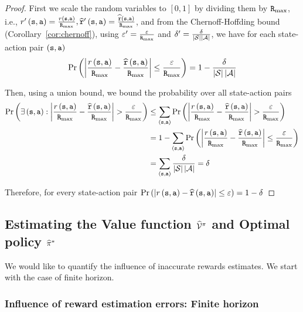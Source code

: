 \begin{proof}
First we scale the random variables to $\left[0,1\right]$ by dividing
them by ${\tt R}_{\max }$, i.e., $r'\left({\tt s},{\tt a}\right)=\frac{r\left({\tt s},{\tt a}\right)}{{\tt R}_{\max }},\widehat{{\tt r}}'\left({\tt s},{\tt a}\right)=\frac{\widehat{{\tt r}}\left({\tt s},{\tt a}\right)}{{\tt R}_{\max }}$,
and from the Chernoff-Hoffding bound (Corollary~\ref{cor:chernoff}), using $\varepsilon'=\frac{\varepsilon}{{\tt R}_{\max }}$
and $\delta'=\frac{\delta}{\left|\mathcal{S}\right|\left|\mathcal{A}\right|}$,
we have for each state-action pair $\left({\tt s},{\tt a}\right)$
\[
\Pr\left(\left|\frac{r\left({\tt s},{\tt a}\right)}{{\tt R}_{\max }}-\frac{\widehat{{\tt r}}\left({\tt s},{\tt a}\right)}{{\tt R}_{\max }}\right|\leq\frac{\varepsilon}{{\tt R}_{\max }}\right)=1-\frac{\delta}{\left|\mathcal{S}\right|\left|\mathcal{A}\right|}
\]

Then, using a union bound, we bound the probability over all state-action
pairs
\begin{align*}
	\Pr\left(\exists\left(\state,\action\right):\left|\frac{r\left(\state,\action\right)}{\Rmax}-\frac{\widehat{\reward}\left(\state,\action\right)}{\Rmax}\right|>\frac{\varepsilon}{\Rmax}\right) & \leq\sum_{\left(\state,\action\right)}\Pr\left(\left|\frac{r\left(\state,\action\right)}{\Rmax}-\frac{\widehat{\reward}\left(\state,\action\right)}{\Rmax}\right|>\frac{\varepsilon}{\Rmax}\right)\\
	& =1-\sum_{\left(\state,\action\right)}\Pr\left(\left|\frac{r\left(\state,\action\right)}{\Rmax}-\frac{\widehat{\reward}\left(\state,\action\right)}{\Rmax}\right|\leq\frac{\varepsilon}{\Rmax}\right)\\
	& =\sum_{\left(\state,\action\right)}\frac{\delta}{\left|\States\right|\left|\Actions\right|}=\delta
\end{align*}

Therefore, for every state-action pair $\Pr\left(\left|r\left({\tt s},{\tt a}\right)-\widehat{{\tt r}}\left({\tt s},{\tt a}\right)\right|\leq\varepsilon\right)=1-\delta$
\end{proof}

\subsection{Estimating the Value function $\widehat{\mathcal{V}}^{\pi}$ and Optimal
	policy $\widehat{\pi}^{*}$}

We would like to quantify the influence of inaccurate rewards estimates. We start with the case of finite
horizon.

\subsubsection{Influence of reward estimation errors: Finite horizon}


